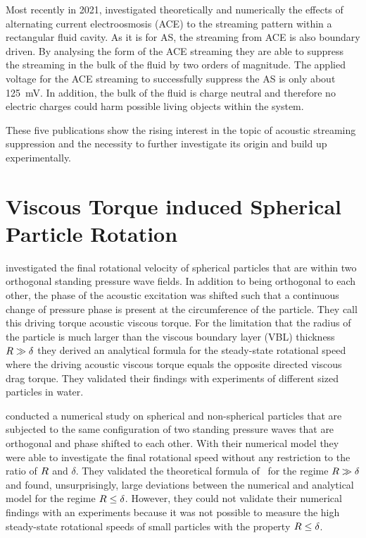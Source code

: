 Most recently in 2021,  investigated theoretically and 
numerically the effects of alternating current electroosmosis (ACE) to the 
streaming pattern within a rectangular fluid cavity. As it is for AS, the 
streaming from ACE is also boundary driven. By analysing the form of the ACE 
streaming they are able to suppress the streaming in the bulk of the fluid by 
two orders of magnitude. The applied voltage for the ACE streaming to 
successfully suppress the AS is only about \SI{125}{\milli\volt}. In addition, 
the bulk of the fluid is charge neutral and therefore no electric charges could 
harm possible living objects within the system.

These five publications show the rising interest in the topic of acoustic 
streaming suppression and the necessity to further investigate its origin and 
build up experimentally.

\section{Viscous Torque induced Spherical Particle Rotation}

 investigated the final rotational velocity of spherical 
particles that are within two orthogonal standing pressure wave fields. In 
addition to being orthogonal to each other, the phase of the acoustic 
excitation was shifted such that a continuous change of pressure phase is 
present at the circumference of the particle. They call this driving torque 
acoustic viscous torque. For the limitation that the radius of the particle is 
much larger than the viscous boundary layer (VBL) thickness $R\gg\delta$ they 
derived an analytical formula for the steady-state rotational speed where the 
driving acoustic viscous torque equals the opposite directed viscous drag 
torque. They validated their findings with experiments of different sized 
particles in water.

 conducted a numerical study on spherical and non-spherical 
particles that are subjected to the same configuration of two standing pressure 
waves that are orthogonal and phase shifted to each other. With their numerical 
model they were able to investigate the final rotational speed without any 
restriction to the ratio of $R$ and $\delta$. They validated the theoretical 
formula of~\cite{Lamprecht2015} for the regime $R\gg\delta$ and found, 
unsurprisingly, large deviations between the numerical and analytical model for 
the regime $R\leq\delta$. However, they could not validate their numerical 
findings with an experiments because it was not possible to measure the high 
steady-state rotational speeds of small particles with the property 
$R\leq\delta$.

